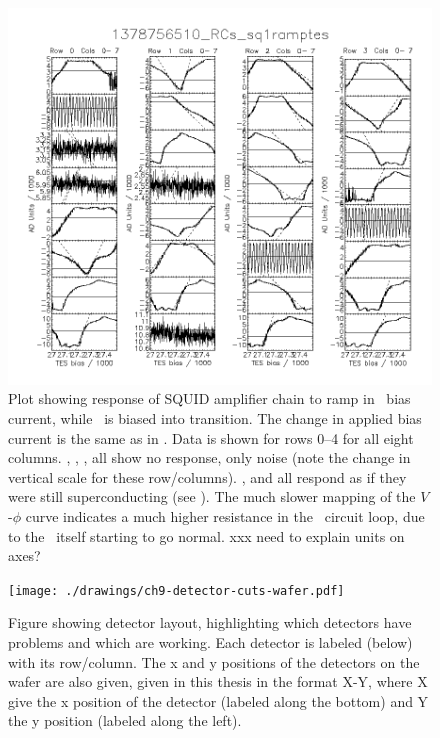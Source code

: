 \begin{figure}[th]
\centering
\includegraphics[width=\textwidth]{./images/1378756510_RCs_sq1ramptes_00.png}
\caption{Plot showing response of SQUID amplifier chain to ramp in \TES\ bias current, while \TES\ is biased into transition. The change in applied bias current is the same as in .
Data is shown for rows 0--4 for all eight columns.
, , ,  all show no response, only noise (note the change in vertical scale for these row/columns).
,  and  all respond as if they were still superconducting (see ).
The much slower mapping of the $V$-$\phi$ curve indicates a much higher resistance in the \TES\ circuit loop, due to the \TES\ itself starting to go normal.
xxx need to explain units on axes?}
\label{fig:tes-bias-ramp-trans}
\end{figure}

\begin{figure}
\centering
\texttt{[image: ./drawings/ch9-detector-cuts-wafer.pdf]}
\caption{
Figure showing detector layout, highlighting which detectors have problems and which are working.
Each detector is labeled (below) with its row/column.
The x and y positions of the detectors on the wafer are also given, given in this thesis in the format X-Y, where X give the x position of the detector (labeled along the bottom) and Y the y position (labeled along the left).
}
\label{fig:detector-cuts-wafer}
\end{figure}

